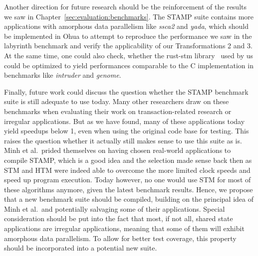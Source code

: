 Another direction for future research should be the reinforcement of the results we saw in Chapter~\ref{sec:evaluation:benchmarks}.
The STAMP suite contains more applications with amorphous data parallelism like \emph{ssca2} and \emph{yada}, which should be implemented in Ohua to attempt to reproduce the performance we saw in the labyrinth benchmark and verify the applicability of our Transformations 2 and 3.
At the same time, one could also check, whether the rust-stm library~\cite{bergmann2020stm} used by us could be optimized to yield performances comparable to the C implementation in benchmarks like \emph{intruder} and \emph{genome}.

Finally, future work could discuss the question whether the STAMP benchmark suite is still adequate to use today.
Many other researchers draw on these benchmarks when evaluating their work on transaction-related research or irregular applications.
But as we have found, many of these applications today yield speedups below 1, even when using the original code base for testing.
This raises the question whether it actually still makes sense to use this suite as is.
Minh et al.\ prided themselves on having chosen real-world applications to compile STAMP, which is a good idea and the selection made sense back then as STM and HTM were indeed able to overcome the more limited clock speeds and speed up program execution.
Today however, no one would use STM for most of these algorithms anymore, given the latest benchmark results.
Hence, we propose that a new benchmark suite should be compiled, building on the principal idea of Minh et al.\ and potentially salvaging some of their applications.
Special consideration should be put into the fact that most, if not all, shared state applications are irregular applications, meaning that some of them will exhibit amorphous data parallelism.
To allow for better test coverage, this property should be incorporated into a potential new suite.

